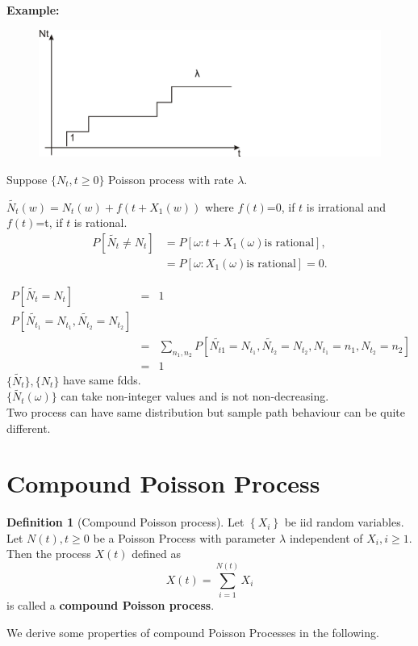 \documentclass[a4paper,10pt]{article}
\theoremstyle{plain}
\theoremstyle{definition}
\newtheorem{defn}[thm]{Definition}
\theoremstyle{remark}
\begin{document}
   \textbf{Example:}\\
\begin{figure}[h!]
\center
  \includegraphics[width=4.5in]{Figures/rate.PNG}\\
\end{figure}
Suppose $\{N_{t}, t \geq 0\}$ Poisson process with rate $\lambda$. 

$\tilde{N_{t}}(w)= N_{t}(w)+f(t+X_{1}(w))$ where $f(t)$=0, if $t$ is irrational and $f(t)$=t, if $t$ is rational.\\
\begin{eqnarray*}
  P[\tilde{N_{t}}\neq N_{t}] &= P[\omega:t+X_{1}(\omega) \text{is rational}],\\
  &= P[\omega:X_1(\omega)  \text{is rational} ] =0.
\end{eqnarray*}
 
\begin{eqnarray*}
  P[\tilde{N_{t}}= N_{t}] &=& 1\\
  P[\tilde{N_{t_1}}= N_{t_1},\tilde{N_{t_2}}= N_{t_2} ] \\
  &=& \sum_{n_{1},n_{2}}P[\tilde{N_{t1}}= N_{t_1},\tilde{N_{t_2}}= N_{t_2}, N_{t_1}=n_1, N_{t_2}=n_2 ] \\
   &=& 1
\end{eqnarray*}
$\{\tilde{N_{t}}\}, \{N_{t}\}$ have same fdds.\\
$\{\tilde{N_{t}}(\omega)\}$ can take non-integer values and is not non-decreasing.\\
Two process can have same distribution but sample path behaviour can be quite different.\\


\section{Compound Poisson Process}
\begin{defn}[Compound Poisson process] Let $\left\{X_i\right\}$ be iid random variables. Let $N(t), t\geq 0$ be a Poisson Process with parameter $\lambda$ independent of $X_i, i\geq 1$. Then the process $X(t)$ defined as
\begin{equation*}
X(t) = \sum_{i=1}^{N(t)} X_i
\end{equation*}
is called a \textbf{compound Poisson process}.
\end{defn}
We derive some properties of compound Poisson Processes in the following.
\end{document}
